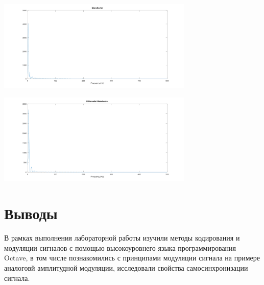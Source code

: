 \begin{enumerate}
\begin{center}
            \label{img:coding-spectre-rz}
        \end{center}
        \begin{center}
            \centering
            \includegraphics[width=0.7\textwidth]{../octave/coding/spectre/manchester.png}
            \label{img:coding-spectre-manchester}
        \end{center}
        \begin{center}
            \centering
            \includegraphics[width=0.7\textwidth]{../octave/coding/spectre/diffmanc.png}
            \label{img:coding-spectre-diffmanc}
        \end{center}

\end{enumerate}

\section{Выводы}
В рамках выполнения лабораторной работы изучили методы кодирования и модуляции
сигналов с помощью высокоуровнего языка программирования Octave, в том числе
познакомились с принципами модуляции сигнала на примере аналоговй амплитудной
модуляции, исследовали свойства самосинхронизации сигнала.

